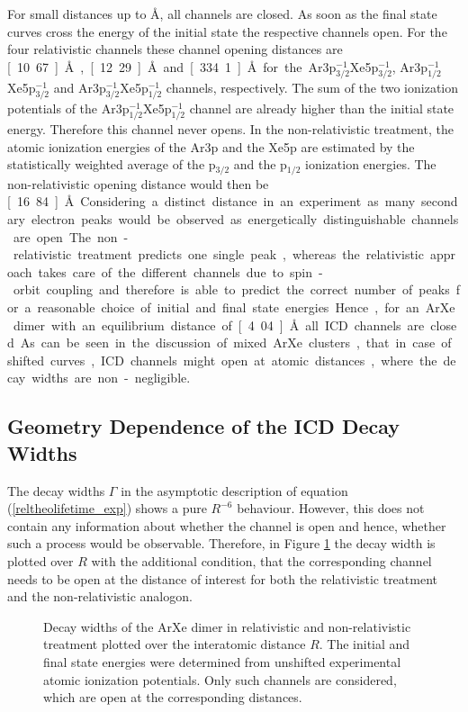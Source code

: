 For small distances up to \unit[10]{\AA}, all channels are closed. As soon as the final
state curves cross the energy of the initial state
the respective channels open. For the four relativistic channels these
channel opening distances are
\unit[10.67]{\AA}, \unit[12.29]{\AA} and \unit[334.1]{\AA}
for the Ar3p$_{3/2}^{-1}$Xe5p$_{3/2}^{-1}$,
Ar3p$_{1/2}^{-1}$Xe5p$_{3/2}^{-1}$ and Ar3p$_{3/2}^{-1}$Xe5p$_{1/2}^{-1}$
channels, respectively.
The sum of the two ionization potentials of the
Ar3p$_{1/2}^{-1}$Xe5p$_{1/2}^{-1}$ channel are already higher than
the initial state energy. Therefore this channel never opens.
In the non-relativistic treatment, the atomic ionization energies of the
Ar3p and the Xe5p are estimated by the statistically weighted average of the
p$_{3/2}$ and the p$_{1/2}$ ionization energies. The non-relativistic
opening distance would then be
\unit[16.84]{\AA}.

Considering a distinct distance
in an experiment as many secondary electron peaks would be observed as
energetically distinguishable channels are open. The non-relativistic
treatment predicts one single peak, whereas the relativistic approach takes
care of the different channels due to spin-orbit coupling and therefore is
able to predict the correct number of peaks for a reasonable choice of initial
and final state energies.

Hence, for an ArXe dimer with an equilibrium distance of \unit[4.04]{\AA}
all ICD channels are closed. As can be seen in the discussion of mixed
ArXe clusters, that in case of shifted curves, ICD channels might
open at atomic distances, where the decay widths are non-negligible.


\subsection{Geometry Dependence of the ICD Decay Widths}

The decay widths $\Gamma$ in the asymptotic description of equation
(\ref{reltheolifetime_exp}) shows a pure $R^{-6}$ behaviour.
However, this does not contain any information about whether the channel is
open and hence, whether such a process would be observable. Therefore,
in Figure \ref{figure:ArXe_gamma_unshifted} the decay width is plotted
over $R$ with the additional condition, that the corresponding channel needs
to be open at the distance of interest for both the relativistic treatment
and the non-relativistic analogon.

\begin{figure}[h]
  \centering
  
  \caption{Decay widths of the ArXe dimer in relativistic and non-relativistic
           treatment plotted over the interatomic
           distance $R$. The initial and final state energies were determined
           from unshifted experimental atomic ionization potentials. Only such
           channels are considered, which are open at the corresponding
           distances.}
  \label{figure:ArXe_gamma_unshifted}
\end{figure}

